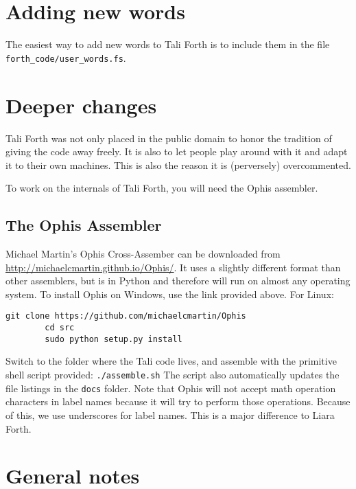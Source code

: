 \section{Adding new words}

The easiest way to add new words to Tali Forth is to include them in the file
\texttt{forth\_code/user\_words.fs}. 


\section{Deeper changes}

Tali Forth was not only placed in the public domain to honor the tradition of
giving the code away freely. It is also to let people play around with it and
adapt it to their own machines. This is also the reason it is (perversely)
overcommented.

To work on the internals of Tali Forth, you will need the Ophis assembler.

\subsection{The Ophis Assembler}

Michael Martin's Ophis Cross-Assember can be downloaded from
\href{http://michaelcmartin.github.io/Ophis/}{http://michaelcmartin.github.io/Ophis/}.
It uses a slightly different format than other assemblers, but is in Python and
therefore will run on almost any operating system. To install Ophis on Windows,
use the link provided above. For Linux:

\begin{lstlisting}[frame=single]
        git clone https://github.com/michaelcmartin/Ophis
        cd src
        sudo python setup.py install
\end{lstlisting}

Switch to the folder where the Tali code lives, and assemble with the primitive
shell script provided: \texttt{./assemble.sh} The script also automatically
updates the file listings in the \texttt{docs} folder. Note that Ophis will not
accept math operation characters in label names because it will try to perform
those operations. Because of this, we use underscores for label names. This is a
major difference to Liara Forth.



\section{General notes}

